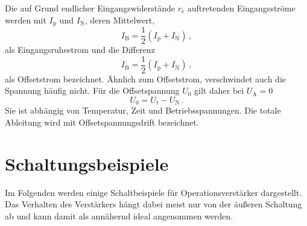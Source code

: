 Die auf Grund endlicher Eingangswiderstände $r_\text{e}$ auftretenden
Eingangsströme werden mit $I_\text{p}$ und $I_\text{N}$, deren
Mittelwert,
\begin{equation}
\label{eq:eingangsruhestrom}
    I_\text{B} = \frac{1}{2}\left(I_\text{p} + I_\text{N}\right)\,,
\end{equation}
als Eingangsruhestrom und die Differenz
\begin{equation}
\label{eq:offsetstrom}
    I_\text{B} = \frac{1}{2}\left(I_\text{p} + I_\text{N}\right)\,,
\end{equation}
als Offsetstrom bezeichnet.
Ähnlich zum Offsetstrom, verschwindet auch die Spannung häufig nicht.
Für die Offsetspannung $U_0$ gilt daher bei $U_\text{A} = 0$
\begin{equation}
\label{eq:offsetspannung}
    U_0 = U_\text{t} - U_\text{N}\,.
\end{equation}
Sie ist abhängig von Temperatur, Zeit und Betriebsspannungen. Die totale
Ableitung wird mit Offsetspannungsdrift bezeichnet.


\section{Schaltungsbeispiele}
\label{sec:schaltungsbeispiele}
Im Folgenden werden einige Schaltbeispiele für Operationsverstärker
dargestellt. Das Verhalten des Verstärkers hängt dabei meist nur von der
äußeren Schaltung ab und kann damit als annähernd ideal angenommen werden.

